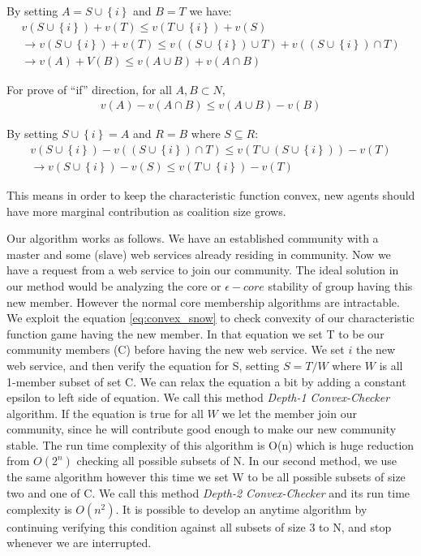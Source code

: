 \documentclass[10pt, conference, compsocconf]{IEEEtran}
\theoremstyle{plain}
\theoremstyle{definition}
\begin{document}
By setting $A = S \cup \left\{i\right\}$ and $B = T$ we have:
\setlength{\abovedisplayshortskip}{2pt}
\begin{gather*}
v(S \cup \left\{i\right\}) + v(T) \leq v (T \cup \left\{i\right\}) + v(S)
\\
\rightarrow v(S \cup \left\{i\right\}) + v(T) \leq v((S \cup \left\{i\right\}) \cup T) + v((S \cup \left\{i\right\}) \cap T)
\\
\rightarrow v(A) + V(B) \leq v(A \cup B) + v(A \cap B)
\end{gather*}

For prove of ``if'' direction, for all $A, B \subset N$,
\setlength{\abovedisplayshortskip}{2pt}
\begin{gather*}
v(A) - v(A \cap B) \leq v(A \cup B) - v(B)
\end{gather*}

By setting $S \cup \left\{i\right\} = A$ and $R = B$ where $S \subseteq R$:
\setlength{\abovedisplayshortskip}{2pt}
\begin{gather*}
v(S \cup \left\{i\right\}) - v((S \cup \left\{i\right\}) \cap T) \leq v(T \cup (S \cup \left\{i\right\})) - v(T)
\\
\rightarrow v(S \cup \left\{i\right\}) - v(S) \leq v(T \cup \left\{i\right\}) - v(T)
\end{gather*}


This means in order to keep the characteristic function convex, new agents should have more marginal contribution as coalition size grows.

Our algorithm works as follows. We have an established community with a master and some (slave) web services already residing in community. Now we have a request from a web service to join our community. The ideal solution in our method would be analyzing the core or $\epsilon-core$ stability of group having this new member. However the normal core membership algorithms are intractable. We exploit the equation \ref{eq:convex_snow} to check convexity of our characteristic function game having the new member. In that equation we set T to be our community members (C) before having the new web service. We set ${i}$ the new web service, and then verify the equation for S, setting $ S = T / W $ where $W$ is all 1-member subset of set C. We can relax the equation a bit by adding a constant epsilon to left side of equation. We call this method \emph{Depth-1 Convex-Checker} algorithm. If the equation is true for all $W$ we let the member join our community, since he will contribute good enough to make our new community stable. The run time complexity of this algorithm is O(n) which is huge reduction from $O(2^n)$ checking all possible subsets of N. In our second method, we use the same algorithm however this time we set W to be all possible subsets of size two and one of C. We call this method \emph{Depth-2 Convex-Checker} and its run time complexity is $O(n^2)$. It is possible to develop an anytime algorithm by continuing verifying this condition against all subsets of size 3 to N, and stop whenever we are interrupted.
\end{document}
